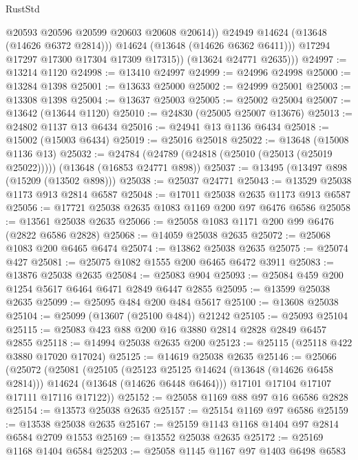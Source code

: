 \begin{lexlean}{RustStd}
\begin{coremodule}
                    @20593
                    @20596
                    @20599
                    @20603
                    @20608
                    @20614))
                @24949
                @14624
                (@13648 (@14626 @6372 @2814)))
              @14624
              (@13648 (@14626 @6362 @6411)))
            @17294
            @17297
            @17300
            @17304
            @17309
            @17315))
        (@13624 @24771 @2635)))
@24997 := @13214 @1120
@24998 := @13410 @24997
@24999 := @24996 @24998
@25000 := @13284 @1398
@25001 := @13633 @25000
@25002 := @24999 @25001
@25003 := @13308 @1398
@25004 := @13637 @25003
@25005 := @25002 @25004
@25007 := @13642 (@13644 @1120)
@25010 := @24830 (@25005 @25007 @13676)
@25013 := @24802 @1137 @13 @6434
@25016 := @24941 @13 @1136 @6434
@25018 := @15002 (@15003 @6434)
@25019 := @25016 @25018
@25022 := @13648 (@15008 @1136 @13)
@25032 := @24784 (@24789 (@24818 (@25010 (@25013 (@25019 @25022))))) (@13648 (@16853 @24771 @898))
@25037 := @13495 (@13497 @898 (@15209 (@13502 @898)))
@25038 := @25037 @24771
@25043 := @13529 @25038 @1173 @913 @2814 @6587
@25048 := @17011 @25038 @2635 @1173 @913 @6587
@25056 := @17721 @25038 @2635 @1083 @1169 @200 @97 @6476 @6586
@25058 := @13561 @25038 @2635
@25066 := @25058 @1083 @1171 @200 @99 @6476 (@2822 @6586 @2828)
@25068 := @14059 @25038 @2635
@25072 := @25068 @1083 @200 @6465 @6474
@25074 := @13862 @25038 @2635
@25075 := @25074 @427
@25081 := @25075 @1082 @1555 @200 @6465 @6472 @3911
@25083 := @13876 @25038 @2635
@25084 := @25083 @904
@25093 := @25084 @459 @200 @1254 @5617 @6464 @6471 @2849 @6447 @2855
@25095 := @13599 @25038 @2635
@25099 := @25095 @484 @200 @484 @5617
@25100 := @13608 @25038
@25104 := @25099 (@13607 (@25100 @484)) @21242
@25105 := @25093 @25104
@25115 := @25083 @423 @88 @200 @16 @3880 @2814 @2828 @2849 @6457 @2855
@25118 := @14994 @25038 @2635 @200
@25123 := @25115 (@25118 @422 @3880 @17020 @17024)
@25125 := @14619 @25038 @2635
@25146 := @25066
    (@25072
      (@25081
        (@25105
          (@25123 @25125 @14624 (@13648 (@14626 @6458 @2814)))
          @14624
          (@13648 (@14626 @6448 @6464)))
        @17101
        @17104
        @17107
        @17111
        @17116
        @17122))
@25152 := @25058 @1169 @88 @97 @16 @6586 @2828
@25154 := @13573 @25038 @2635
@25157 := @25154 @1169 @97 @6586
@25159 := @13538 @25038 @2635
@25167 := @25159 @1143 @1168 @1404 @97 @2814 @6584 @2709 @1553
@25169 := @13552 @25038 @2635
@25172 := @25169 @1168 @1404 @6584
@25203 := @25058
    @1145
    @1167
    @97
    @1403
    @6498
    @6583

\end{coremodule}
\end{lexlean}
